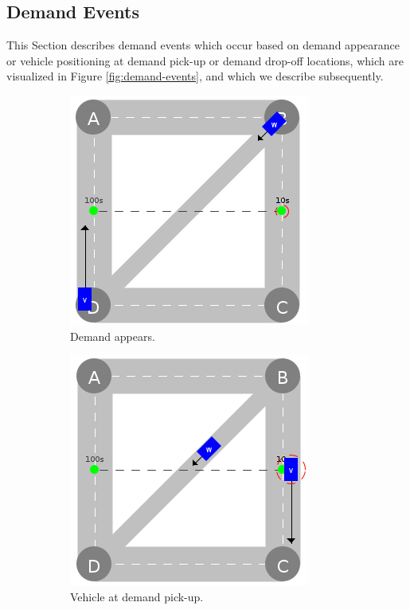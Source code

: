 \documentclass[graybox]{svmult}
\begin{document}
\subsection{Demand Events}
\label{sec:demand-events}
This Section describes demand events which occur based on demand appearance or vehicle positioning at demand pick-up or demand drop-off locations, which are visualized in Figure \ref{fig:demand-events}, and which we describe subsequently.
\vspace{4mm}
\begin{figure}
	\begin{subfigure}{.32\textwidth}
		\centering
		\includegraphics[scale=0.35]{../../events/demand.png}
		\caption{Demand appears.}
		\label{fig:demand-appears}
	\end{subfigure}
	\hfill
	\begin{subfigure}{.32\textwidth}
		\centering
		\includegraphics[scale=0.35]{../../events/vehicle-at-demand-pick-up.png}
		\caption{Vehicle at demand pick-up.}
		\label{fig:vehicle-at-demand-pick-up}
	\end{subfigure}
	\hfill
	\begin{subfigure}{.32\textwidth}

\end{subfigure}
\end{figure}
\end{document}
